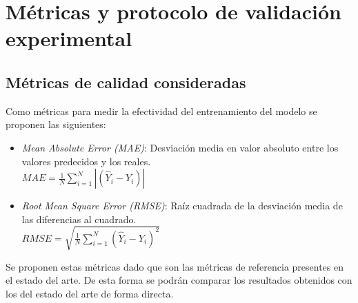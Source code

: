 \section{Métricas y protocolo de validación experimental}

\subsection{Métricas de calidad consideradas}

Como métricas para medir la efectividad del entrenamiento del modelo se proponen las siguientes:
\begin{itemize}
    \item \textit{Mean Absolute Error (MAE)}: Desviación media en valor absoluto entre los valores predecidos y los reales.\\
    
    $MAE = \frac{1}{N}\sum^{N}_{i=1}|(\hat{Y}_i - Y_i)|$
    \item \textit{Root Mean Square Error (RMSE)}: Raíz cuadrada de la desviación media de las diferencias al cuadrado.\\
    
    $RMSE = \sqrt{\frac{1}{N}\sum^{N}_{i=1}(\hat{Y}_i - Y_i)^2}$
\end{itemize}

Se proponen estas métricas dado que son las métricas de referencia presentes en el estado del arte. De esta forma se podrán comparar los resultados obtenidos con los del estado del arte de forma directa.

